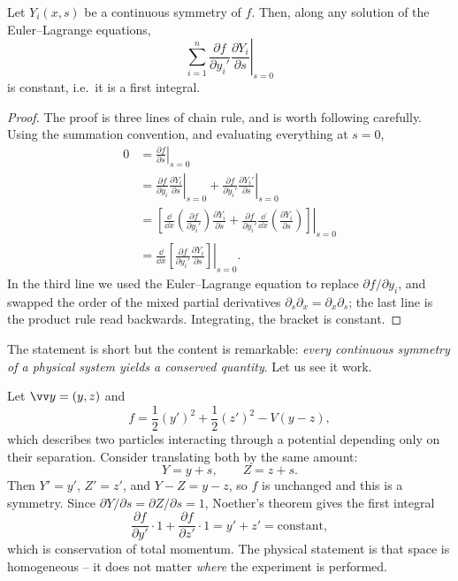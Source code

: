 \documentclass[a4paper]{scrartcl}
\begin{document}
\begin{theorem}
	Let $Y_i(x, s)$ be a continuous symmetry of $f$. Then, along any solution of the Euler--Lagrange equations,
	$$
	\left.\sum_{i=1}^n\frac{\partial f}{\partial y_i'}\frac{\partial Y_i}{\partial s}\right|_{s = 0}
	$$
	is constant, i.e.\ it is a first integral.
\end{theorem}
\begin{proof}
	The proof is three lines of chain rule, and is worth following carefully. Using the summation convention, and evaluating everything at $s = 0$,
	\begin{align*}
		0 &= \left.\frac{\partial f}{\partial s}\right|_{s = 0} \\
		&= \left.\frac{\partial f}{\partial y_i}\frac{\partial Y_i}{\partial s}\right|_{s=0} + \left.\frac{\partial f}{\partial y_i'}\frac{\partial Y_i'}{\partial s}\right|_{s=0} \\
		&= \left.\left[\frac{\dd}{\dd x}\left(\frac{\partial f}{\partial y_i'}\right)\frac{\partial Y_i}{\partial s} + \frac{\partial f}{\partial y_i'}\frac{\dd}{\dd x}\left(\frac{\partial Y_i}{\partial s}\right)\right]\right|_{s=0} \\
		&= \frac{\dd}{\dd x}\left.\left[\frac{\partial f}{\partial y_i'}\frac{\partial Y_i}{\partial s}\right]\right|_{s=0}.
	\end{align*}
	In the third line we used the Euler--Lagrange equation to replace $\partial f/\partial y_i$, and swapped the order of the mixed partial derivatives $\partial_s\partial_x = \partial_x\partial_s$; the last line is the product rule read backwards. Integrating, the bracket is constant.
\end{proof}

The statement is short but the content is remarkable: \emph{every continuous symmetry of a physical system yields a conserved quantity}. Let us see it work.

\begin{example}
	Let $\vv y = (y, z)$ and
	$$
	f = \frac{1}{2}(y')^2 + \frac{1}{2}(z')^2 - V(y - z),
	$$
	which describes two particles interacting through a potential depending only on their separation. Consider translating both by the same amount:
	$$
	Y = y + s, \qquad Z = z + s.
	$$
	Then $Y' = y'$, $Z' = z'$, and $Y - Z = y - z$, so $f$ is unchanged and this is a symmetry. Since $\partial Y/\partial s = \partial Z/\partial s = 1$, Noether's theorem gives the first integral
	$$
	\frac{\partial f}{\partial y'}\cdot 1 + \frac{\partial f}{\partial z'}\cdot 1 = y' + z' = \text{constant},
	$$
	which is conservation of total momentum. The physical statement is that space is homogeneous -- it does not matter \emph{where} the experiment is performed.
\end{example}
\end{document}
